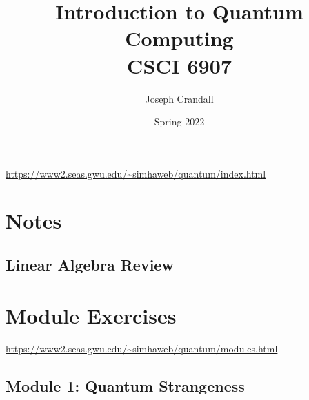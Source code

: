 
\usepackage{algorithm, algpseudocode, color, gensymb, siunitx, soul, subfiles}
\usepackage[a4paper, total={7.5in, 10in}]{geometry}

\title{Introduction to Quantum Computing\\
\large CSCI 6907}
\author{Joseph Crandall}
\date{Spring 2022}


\maketitle

\url{https://www2.seas.gwu.edu/~simhaweb/quantum/index.html}

\section{Notes}

\subsection{Linear Algebra Review}


%

%

%

%

\section{Module Exercises}

\url{https://www2.seas.gwu.edu/~simhaweb/quantum/modules.html}

\subsection{Module 1: Quantum Strangeness}


